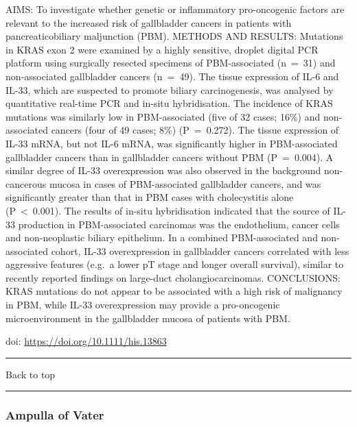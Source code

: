 \documentclass[
]{article}
\renewcommand{\linethickness}{0.05em}
\begin{document}
AIMS: To investigate whether genetic or inflammatory pro-oncogenic
factors are relevant to the increased risk of gallbladder cancers in
patients with pancreaticobiliary maljunction (PBM). METHODS AND RESULTS:
Mutations in KRAS exon 2 were examined by a highly sensitive, droplet
digital PCR platform using surgically resected specimens of
PBM-associated (n~=~31) and non-associated gallbladder cancers (n~=~49).
The tissue expression of IL-6 and IL-33, which are suspected to promote
biliary carcinogenesis, was analysed by quantitative real-time PCR and
in-situ hybridisation. The incidence of KRAS mutations was similarly low
in PBM-associated (five of 32 cases; 16\%) and non-associated cancers
(four of 49 cases; 8\%) (P~=~0.272). The tissue expression of IL-33
mRNA, but not IL-6 mRNA, was significantly higher in PBM-associated
gallbladder cancers than in gallbladder cancers without PBM (P~=~0.004).
A similar degree of IL-33 overexpression was also observed in the
background non-cancerous mucosa in cases of PBM-associated gallbladder
cancers, and was significantly greater than that in PBM cases with
cholecystitis alone (P~\textless~0.001). The results of in-situ
hybridisation indicated that the source of IL-33 production in
PBM-associated carcinomas was the endothelium, cancer cells and
non-neoplastic biliary epithelium. In a combined PBM-associated and
non-associated cohort, IL-33 overexpression in gallbladder cancers
correlated with less aggressive features (e.g.~a lower pT stage and
longer overall survival), similar to recently reported findings on
large-duct cholangiocarcinomas. CONCLUSIONS: KRAS mutations do not
appear to be associated with a high risk of malignancy in PBM, while
IL-33 overexpression may provide a pro-oncogenic microenvironment in the
gallbladder mucosa of patients with PBM.

doi: \url{https://doi.org/10.1111/his.13863}

\begin{center}\rule{0.5\linewidth}{\linethickness}\end{center}

Back to top

\begin{center}\rule{0.5\linewidth}{\linethickness}\end{center}

\pagebreak

\hypertarget{ampullavater}{%
\subsubsection{Ampulla of Vater}\label{ampullavater}}
\end{document}

